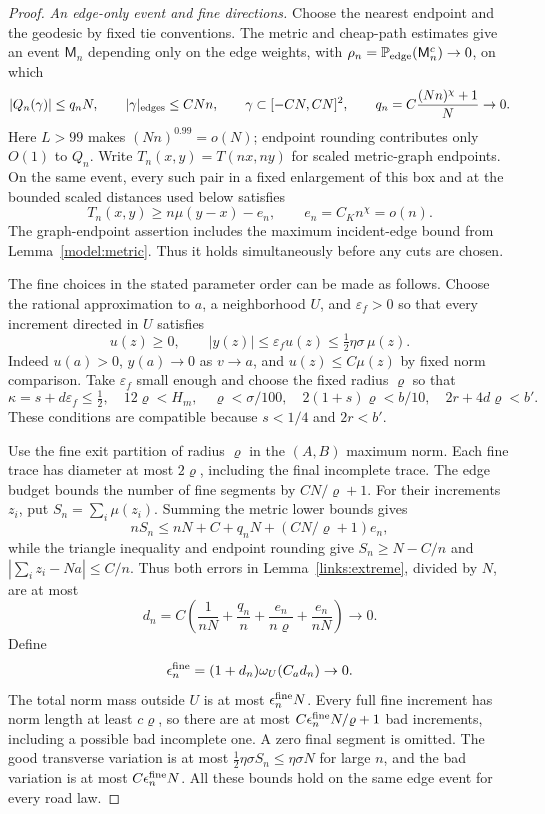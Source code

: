 \begin{proof}
\emph{An edge-only event and fine directions.}
Choose the nearest endpoint and the geodesic by fixed tie conventions.
The metric and cheap-path estimates give an event \(\mathsf M_n\)
depending only on the edge weights, with
\(\rho_n=\mathbb P_{\rm edge}(\mathsf M_n^c)\to0\), on which
\begin{equation}
 |Q_n(\gamma)|\le q_nN,\qquad |\gamma|_{\rm edges}\le CNn,\qquad
 \gamma\subset[-CN,CN]^2,\qquad
 q_n=C\frac{(Nn)^\chi+1}{N}\to0.
 \label{links:long-geodesic}
\end{equation}
Here \(L>99\) makes \((Nn)^{0.99}=o(N)\); endpoint rounding contributes
only \(O(1)\) to \(Q_n\). Write \(T_n(x,y)=T(nx,ny)\) for scaled
metric-graph endpoints. On the same event, every such pair in a fixed
enlargement of this box and at the bounded scaled distances used below
satisfies
\[
 T_n(x,y)\ge n\mu(y-x)-e_n,\qquad e_n=C_Kn^\chi=o(n).
\]
The graph-endpoint assertion includes the maximum incident-edge bound
from Lemma~\ref{model:metric}. Thus it holds simultaneously before any
cuts are chosen.

The fine choices in the stated parameter order can be made as follows.
Choose the rational approximation to \(a\), a neighborhood \(U\), and
\(\varepsilon_f>0\) so that every increment directed in \(U\) satisfies
\[
 u(z)\ge0,\qquad |y(z)|\le\varepsilon_f u(z)
                         \le\tfrac12\eta\sigma\,\mu(z).
\]
Indeed \(u(a)>0\), \(y(a)\to0\) as \(v\to a\), and \(u(z)\le C\mu(z)\)
by fixed norm comparison. Take \(\varepsilon_f\) small enough and choose
the fixed radius \(\varrho\) so that
\begin{equation}
 \kappa=s+d\varepsilon_f\le\tfrac12,\quad
 12\varrho<H_m,\quad \varrho<\sigma/100,\quad
 2(1+s)\varrho<b/10,\quad 2r+4d\varrho<b'.
 \label{links:fine-choices}
\end{equation}
These conditions are compatible because \(s<1/4\) and \(2r<b'\).

Use the fine exit partition of radius \(\varrho\) in the \((A,B)\)
maximum norm. Each fine trace has diameter at most \(2\varrho\),
including the final incomplete trace. The edge budget bounds the number
of fine segments by \(CN/\varrho+1\). For their increments \(z_i\), put
\(S_n=\sum_i\mu(z_i)\). Summing the metric lower bounds gives
\[
 nS_n\le nN+C+q_nN+(CN/\varrho+1)e_n,
\]
while the triangle inequality and endpoint rounding give
\(S_n\ge N-C/n\) and \(|\sum_i z_i-Na|\le C/n\). Thus both errors in
Lemma~\ref{links:extreme}, divided by \(N\), are at most
\[
 d_n=C\left(\frac1{nN}+\frac{q_n}{n}
              +\frac{e_n}{n\varrho}+\frac{e_n}{nN}\right)\to0.
\]
Define
\[
 \epsilon_n^{\rm fine}=(1+d_n)\omega_U(C_a d_n)\to0.
\]
The total norm mass outside \(U\) is at most
\(\epsilon_n^{\rm fine}N\). Every full fine increment has norm length
at least \(c\varrho\), so there are at most
\(C\epsilon_n^{\rm fine}N/\varrho+1\) bad increments, including a
possible bad incomplete one. A zero final segment is omitted.
The good transverse variation is at most
\(\tfrac12\eta\sigma S_n\le\eta\sigma N\) for large \(n\), and the bad
variation is at most \(C\epsilon_n^{\rm fine}N\). All these bounds hold
on the same edge event for every road law.


\end{proof}
